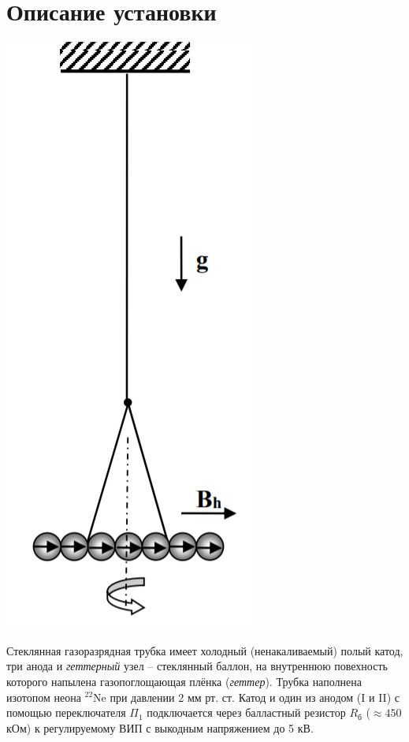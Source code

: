 \documentclass[a4paper,12pt]{article}
\begin{document}
\section*{Описание установки}
\begin{center}
\includegraphics[scale=0.6]{1.png}
\end{center}
Стеклянная газоразрядная трубка имеет холодный (ненакаливаемый) полый катод, три анода и \textit{геттерный} узел -- стеклянный баллон, на внутреннюю повехность которого напылена газопоглощающая плёнка (\textit{геттер}). Трубка наполнена изотопом неона $^22$Ne при давлении 2 мм рт. ст. Катод и один из анодом (I и II) с помощью переключателя $\Pi_1$ подключается через балластный резистор $R_\text{б}$ ($\approx 450$ кОм) к регулируемому ВИП с выкодным напряжением до 5 кВ.\\
\end{document}
